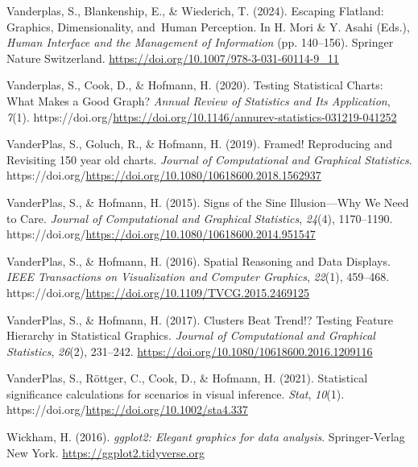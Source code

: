 \documentclass[
  10pt,
  letterpaper,
  DIV=11,
  numbers=noendperiod]{scrartcl}
\newlength{\cslhangindent}
\newenvironment{CSLReferences}[2] %
 {\begin{list}{}{%
  \setlength{\itemindent}{0pt}
  \setlength{\leftmargin}{0pt}
  \setlength{\parsep}{0pt}
  \ifodd #1
   \setlength{\leftmargin}{\cslhangindent}
   \setlength{\itemindent}{-1\cslhangindent}
  \fi
  \setlength{\itemsep}{#2\baselineskip}}}
 {\end{list}}
\begin{document}
\begin{CSLReferences}{1}{0}
Vanderplas, S., Blankenship, E., \& Wiederich, T. (2024). Escaping
{Flatland}: {Graphics}, {Dimensionality}, and~{Human Perception}. In H.
Mori \& Y. Asahi (Eds.), \emph{Human {Interface} and the {Management} of
{Information}} (pp. 140--156). Springer Nature Switzerland.
\url{https://doi.org/10.1007/978-3-031-60114-9_11}

Vanderplas, S., Cook, D., \& Hofmann, H. (2020). Testing {Statistical}
{Charts}: {What} {Makes} a {Good} {Graph}? \emph{Annual Review of
Statistics and Its Application}, \emph{7}(1).
https://doi.org/\url{https://doi.org/10.1146/annurev-statistics-031219-041252}

VanderPlas, S., Goluch, R., \& Hofmann, H. (2019). Framed! {Reproducing}
and {Revisiting} 150 year old charts. \emph{Journal of Computational and
Graphical Statistics}.
https://doi.org/\url{https://doi.org/10.1080/10618600.2018.1562937}

VanderPlas, S., \& Hofmann, H. (2015). Signs of the {Sine}
{Illusion}---{Why} {We} {Need} to {Care}. \emph{Journal of Computational
and Graphical Statistics}, \emph{24}(4), 1170--1190.
https://doi.org/\url{https://doi.org/10.1080/10618600.2014.951547}

VanderPlas, S., \& Hofmann, H. (2016). Spatial {Reasoning} and {Data}
{Displays}. \emph{IEEE Transactions on Visualization and Computer
Graphics}, \emph{22}(1), 459--468.
https://doi.org/\url{https://doi.org/10.1109/TVCG.2015.2469125}

VanderPlas, S., \& Hofmann, H. (2017). Clusters {Beat} {Trend}!?
{Testing} {Feature} {Hierarchy} in {Statistical} {Graphics}.
\emph{Journal of Computational and Graphical Statistics}, \emph{26}(2),
231--242. \url{https://doi.org/10.1080/10618600.2016.1209116}

VanderPlas, S., Röttger, C., Cook, D., \& Hofmann, H. (2021).
Statistical significance calculations for scenarios in visual inference.
\emph{Stat}, \emph{10}(1).
https://doi.org/\url{https://doi.org/10.1002/sta4.337}

Wickham, H. (2016). \emph{ggplot2: Elegant graphics for data analysis}.
Springer-Verlag New York. \url{https://ggplot2.tidyverse.org}


\end{CSLReferences}
\end{document}
